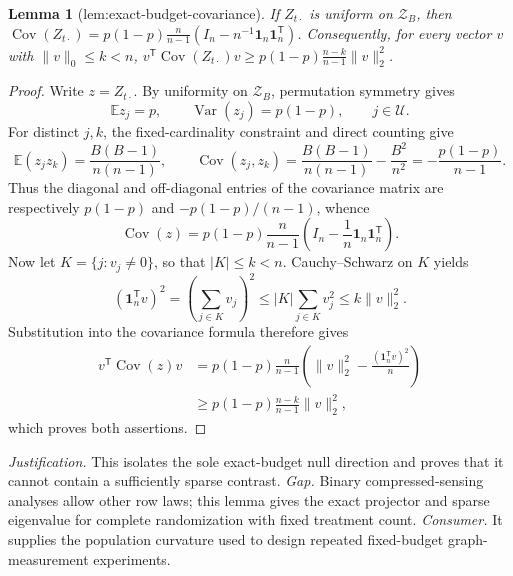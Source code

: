 \documentclass{article}
\newtheorem{lemma}{Lemma}
\begin{document}
\begin{lemma}[lem:exact-budget-covariance]\label{lem:exact-budget-covariance}
If \(Z_{t\cdot}\) is uniform on \(\mathcal Z_B\), then \(\operatorname{Cov}(Z_{t\cdot})=p(1-p)\frac{n}{n-1}(I_n-n^{-1}\mathbf 1_n\mathbf 1_n^{\mathsf T})\). Consequently, for every vector \(v\) with \(\lVert v\rVert_0\le k<n\), \(v^{\mathsf T}\operatorname{Cov}(Z_{t\cdot})v\ge p(1-p)\frac{n-k}{n-1}\lVert v\rVert_2^2\).
\end{lemma}
\begin{proof}
Write \(z=Z_{t\cdot}\).  By uniformity on \(\mathcal Z_B\), permutation symmetry gives
\[
 \mathbb E z_j=p,
 \qquad
 \operatorname{Var}(z_j)=p(1-p),
 \qquad j\in\mathcal U.
\]
For distinct \(j,k\), the fixed-cardinality constraint and direct counting give
\[
 \mathbb E(z_jz_k)
 =\frac{B(B-1)}{n(n-1)},
 \qquad
 \operatorname{Cov}(z_j,z_k)
 =\frac{B(B-1)}{n(n-1)}-\frac{B^2}{n^2}
 =-\frac{p(1-p)}{n-1}.
\]
Thus the diagonal and off-diagonal entries of the covariance matrix are respectively \(p(1-p)\) and \(-p(1-p)/(n-1)\), whence
\[
 \operatorname{Cov}(z)
 =p(1-p)\frac{n}{n-1}
   \left(I_n-\frac1n\mathbf 1_n\mathbf 1_n^{\mathsf T}\right).
\]
Now let \(K=\{j:v_j\ne0\}\), so that \(|K|\le k<n\).  Cauchy--Schwarz on \(K\) yields
\[
 (\mathbf 1_n^{\mathsf T}v)^2
 =\left(\sum_{j\in K}v_j\right)^2
 \le |K|\sum_{j\in K}v_j^2
 \le k\lVert v\rVert_2^2.
\]
Substitution into the covariance formula therefore gives
\[
 \begin{aligned}
 v^{\mathsf T}\operatorname{Cov}(z)v
 &=p(1-p)\frac{n}{n-1}
   \left(\lVert v\rVert_2^2-\frac{(\mathbf 1_n^{\mathsf T}v)^2}{n}\right)\\
 &\ge p(1-p)\frac{n-k}{n-1}\lVert v\rVert_2^2,
 \end{aligned}
\]
which proves both assertions.
\end{proof}
\par\smallskip\noindent \textit{Justification.} This isolates the sole exact-budget null direction and proves that it cannot contain a sufficiently sparse contrast. \textit{Gap.} Binary compressed-sensing analyses allow other row laws; this lemma gives the exact projector and sparse eigenvalue for complete randomization with fixed treatment count. \textit{Consumer.} It supplies the population curvature used to design repeated fixed-budget graph-measurement experiments.
\end{document}
